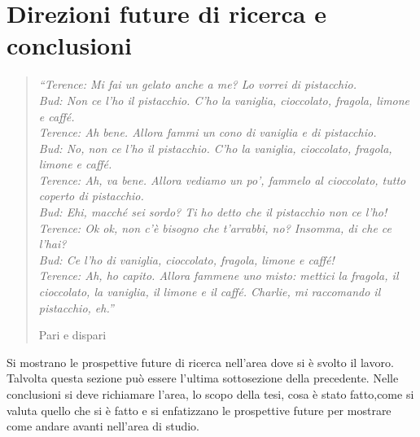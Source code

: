 \chapter*{Direzioni future di ricerca e conclusioni}
\label{conclusioni}
\thispagestyle{empty}

\begin{quotation}
{\footnotesize
\noindent\emph{``Terence: Mi fai un gelato anche a me? Lo vorrei di pistacchio. \\
Bud: Non ce l'ho il pistacchio. C'ho la vaniglia, cioccolato, fragola, limone e caff\'e. \\
Terence: Ah bene. Allora fammi un cono di vaniglia e di pistacchio. \\
Bud: No, non ce l'ho il pistacchio. C'ho la vaniglia, cioccolato, fragola, limone e caff\'e. \\
Terence: Ah, va bene. Allora vediamo un po', fammelo al cioccolato, tutto coperto di pistacchio. \\
Bud: Ehi, macché sei sordo? Ti ho detto che il pistacchio non ce l'ho! \\
Terence: Ok ok, non c'è bisogno che t'arrabbi, no? Insomma, di che ce l'hai? \\
Bud: Ce l'ho di vaniglia, cioccolato, fragola, limone e caff\'e! \\
Terence: Ah, ho capito. Allora fammene uno misto: mettici la fragola, il cioccolato, la vaniglia, il limone e il caff\'e. Charlie, mi raccomando il pistacchio, eh.''}
\begin{flushright}
Pari e dispari
\end{flushright}
}
\end{quotation}
\vspace{0.5cm}

\noindent Si mostrano le prospettive future di ricerca nell'area dove si \`e svolto il lavoro. Talvolta questa sezione pu\`o essere l'ultima sottosezione della precedente. Nelle conclusioni si deve richiamare l'area, lo scopo della tesi, cosa \`e stato fatto,come si valuta quello che si \`e fatto e si enfatizzano le prospettive future per mostrare come andare avanti nell'area di studio.